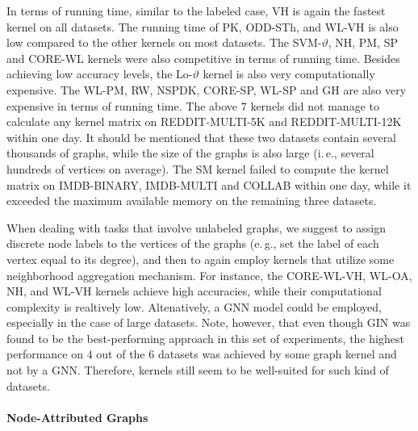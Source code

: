 \documentclass[twoside,11pt]{article}
\newcommand{\eg}{e.\,g., }
\newcommand{\ie}{i.\,e., }
\begin{document}
In terms of running time, similar to the labeled case, VH is again the fastest kernel on all datasets.
The running time of PK, ODD-STh, and WL-VH is also low compared to the other kernels on most datasets.
The SVM-$\vartheta$, NH, PM, SP and CORE-WL kernels were also competitive in terms of running time.
Besides achieving low accuracy levels, the Lo-$\vartheta$ kernel is also very computationally expensive.
The WL-PM, RW, NSPDK, CORE-SP, WL-SP and GH are also very expensive in terms of running time.
The above $7$ kernels did not manage to calculate any kernel matrix on REDDIT-MULTI-5K and REDDIT-MULTI-12K within one day.
It should be mentioned that these two datasets contain several thousands of graphs, while the size of the graphs is also large (\ie several hundreds of vertices on average).
The SM kernel failed to compute the kernel matrix on IMDB-BINARY, IMDB-MULTI and COLLAB within one day, while it exceeded the maximum available memory on the remaining three datasets.

When dealing with tasks that involve unlabeled graphs, we suggest to assign discrete node labels to the vertices of the graphs (\eg set the label of each vertex equal to its degree), and then to again employ kernels that utilize some neighborhood aggregation mechanism.
For instance, the CORE-WL-VH, WL-OA, NH, and WL-VH kernels achieve high accuracies, while their computational complexity is realtively low.
Altenatively, a GNN model could be employed, especially in the case of large datasets.
Note, however, that even though GIN was found to be the best-performing approach in this set of experiments, the highest performance on $4$ out of the $6$ datasets was achieved by some graph kernel and not by a GNN.
Therefore, kernels still seem to be well-suited for such kind of datasets.

\paragraph{Node-Attributed Graphs}
\end{document}

